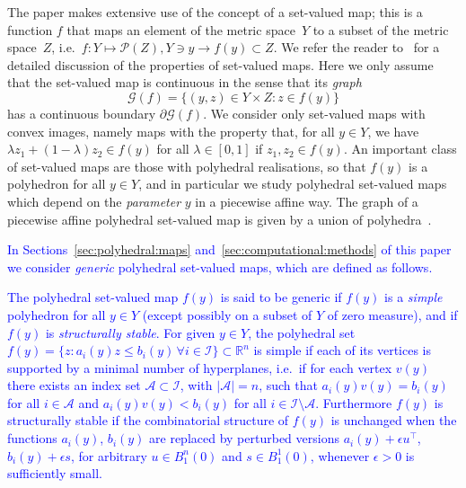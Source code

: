 \documentclass[smallextended]{svjour3}       %
\numberwithin{equation}{section}
\newcommand{\revision}[1]{\textcolor{blue}{#1}}
\begin{document}
The paper makes extensive use of the concept of a set-valued map; this is a function $f$ that maps an element of the metric space~$Y$ to a subset of the metric space~$Z$, i.e.\ $f:Y\mapsto\mathscr P(Z), Y\ni y\rightarrow f(y)\subset Z$. 
%
We refer the reader to~\cite{Aubin:2009} for a detailed discussion of the properties of set-valued maps. Here we only assume that the set-valued map is continuous in the sense that its \emph{graph} 
%
\begin{equation}
  \mathscr G(f) = \{(y,z)\in Y\times Z: z\in f(y)\} 
\end{equation}
%
has a continuous boundary $\partial\mathscr G(f)$.
%
We consider only set-valued maps with convex images, namely maps with the property that, for all $y\in Y$, we have $\lambda z_1+(1-\lambda)z_2\in f(y)$ for all $\lambda\in[0,1]$ if $z_1,z_2\in f(y)$.
%
An important class of set-valued maps are those with polyhedral realisations, so that $f(y)$ is a polyhedron for all $y\in Y$, and in particular we study polyhedral set-valued maps which depend on the \emph{parameter} $y$ in a piecewise affine way.
%
The graph of a  piecewise affine polyhedral set-valued map is given by a union of polyhedra~\cite{Finzel:2000}.

\revision{In Sections~\ref{sec:polyhedral:maps} and~\ref{sec:computational:methods}
of this paper we consider \emph{generic} polyhedral set-valued maps, which are defined as follows.}

\begin{definition}\label{def:generic_polyhedral_set}
\revision{The polyhedral set-valued map $f(y)$ is said to be generic if $f(y)$ is a \emph{simple} polyhedron for all $y\in Y$ (except possibly on a subset of $Y$ of zero measure), and if $f(y)$ is \emph{structurally stable}. For given $y\in Y$, the polyhedral set $f(y) = \{z: a_i(y)z\leq b_i(y)\, \forall i\in \mathcal I\}\subset \mathbb R^n$ is simple if each of its vertices is supported by a minimal number of hyperplanes, i.e.~if for each vertex $v(y)$ there exists an index set $\mathcal A\subset \mathcal I$, with $\lvert \mathcal A\rvert = n$, such that $a_i(y)v(y)=b_i(y)$ for all $i\in\mathcal A$ and $a_i(y)v(y)<b_i(y)$ for all $i\in \mathcal I \setminus \mathcal A$.
%
Furthermore $f(y)$ is structurally stable if the combinatorial structure of $f(y)$ is unchanged when the functions $a_i(y)$, $b_i(y)$ are replaced by perturbed versions $a_i(y) + \epsilon u^{\!\top}$, $b_i(y)+\epsilon s$, for arbitrary $u\in B_1^n(0)$ and $s\in B_1^1(0)$, 
whenever $\epsilon> 0$ is sufficiently small.}
\end{definition}
\end{document}
